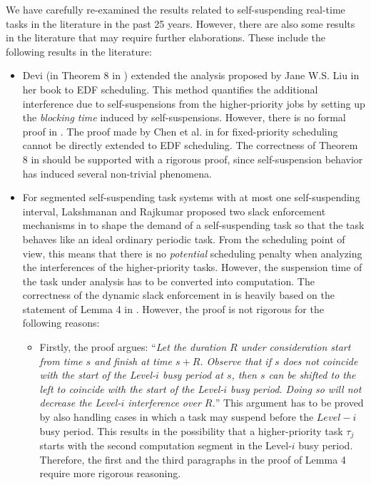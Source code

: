 \label{sec:open-issues-existing}  
We have carefully re-examined the results related to self-suspending
real-time tasks in the literature in the past 25 years. However, there
are also some results in the literature that may require further
elaborations. These include the following results in the literature:
\begin{itemize}
\item Devi (in Theorem 8 in \cite[Section
  4.5]{DBLP:conf/ecrts/Devi03}) extended the analysis proposed by Jane
  W.S. Liu in her book \cite[Page 164-165]{Liu:2000:RS:518501} to
  EDF scheduling. This method quantifies the additional interference
  due to self-suspensions from the higher-priority jobs by setting up
  the \emph{blocking time} induced by self-suspensions. However, there
  is no formal proof in \cite{DBLP:conf/ecrts/Devi03}. The proof made
  by Chen et al. in \cite{ChenHuangNelissen,ChenECRTS2016-suspension} for fixed-priority
  scheduling cannot be directly extended to EDF scheduling. The
  correctness of Theorem 8 in \cite[Section
  4.5]{DBLP:conf/ecrts/Devi03} should be supported with a rigorous
  proof, since self-suspension behavior has induced several
  non-trivial phenomena.

\item For segmented self-suspending task systems with at most one
  self-suspending interval, Lakshmanan and Rajkumar proposed two slack
  enforcement mechanisms in \cite{LR:rtas10} to shape the demand of a
  self-suspending task so that the task behaves like an ideal ordinary
  periodic
  task.  From the scheduling point of view, this means that there is
  no \emph{potential} scheduling penalty when analyzing the interferences of the
  higher-priority tasks. However, the suspension time of the task under
  analysis has to be converted into computation. The correctness of the dynamic slack
  enforcement in \cite{LR:rtas10} is heavily based on the statement of Lemma
  4 in \cite{LR:rtas10}. However, the proof is not rigorous for the
  following reasons:
  \begin{itemize}
  \item Firstly, the proof argues: ``\emph{Let the duration $R$ under
    consideration start from time $s$ and finish at time $s +
    R$. Observe that if $s$ does not coincide with the start of the
    Level-$i$ busy period at $s$, then $s$ can be shifted to the left
    to coincide with the start of the Level-$i$ busy period. Doing so
    will not decrease the Level-$i$ interference over $R$.}'' This
    argument has to be proved by also handling cases in which a task
    may suspend before the $Level-i$ busy period. This results in the
    possibility that a higher-priority task $\tau_j$ starts with the
    second computation segment in the Level-$i$ busy
    period. Therefore, the first and the third paragraphs in the proof
    of Lemma 4 \cite{LR:rtas10} require more rigorous reasoning.


\end{itemize}
\end{itemize}
